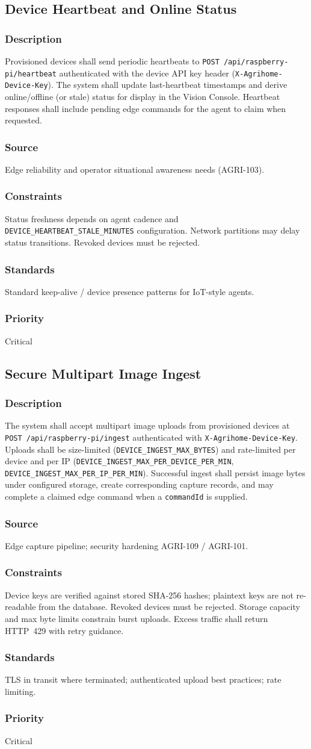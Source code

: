 \documentclass[11pt,letterpaper]{article}
\newcommand{\reqblock}[5]{%
\subsubsection{Description} #1
\subsubsection{Source} #2
\subsubsection{Constraints} #3
\subsubsection{Standards} #4
\subsubsection{Priority} #5
}
\begin{document}
\subsection{Device Heartbeat and Online Status}
\reqblock
{Provisioned devices shall send periodic heartbeats to \texttt{POST /api/raspberry-pi/heartbeat}
authenticated with the device API key header (\texttt{X-Agrihome-Device-Key}). The system shall update
last-heartbeat timestamps and derive online/offline (or stale) status for display in the Vision Console.
Heartbeat responses shall include pending edge commands for the agent to claim when requested.}
{Edge reliability and operator situational awareness needs (AGRI-103).}
{Status freshness depends on agent cadence and \texttt{DEVICE\_HEARTBEAT\_STALE\_MINUTES}
configuration. Network partitions may delay status transitions. Revoked devices must be rejected.}
{Standard keep-alive / device presence patterns for IoT-style agents.}
{Critical}

\subsection{Secure Multipart Image Ingest}
\reqblock
{The system shall accept multipart image uploads from provisioned devices at
\texttt{POST /api/raspberry-pi/ingest} authenticated with \texttt{X-Agrihome-Device-Key}. Uploads shall
be size-limited (\texttt{DEVICE\_INGEST\_MAX\_BYTES}) and rate-limited per device and per IP
(\texttt{DEVICE\_INGEST\_MAX\_PER\_DEVICE\_PER\_MIN}, \texttt{DEVICE\_INGEST\_MAX\_PER\_IP\_PER\_MIN}).
Successful ingest shall persist image bytes under configured storage, create corresponding capture
records, and may complete a claimed edge command when a \texttt{commandId} is supplied.}
{Edge capture pipeline; security hardening AGRI-109 / AGRI-101.}
{Device keys are verified against stored SHA-256 hashes; plaintext keys are not re-readable from the
database. Revoked devices must be rejected. Storage capacity and max byte limits constrain burst
uploads. Excess traffic shall return HTTP~429 with retry guidance.}
{TLS in transit where terminated; authenticated upload best practices; rate limiting.}
{Critical}
\end{document}
